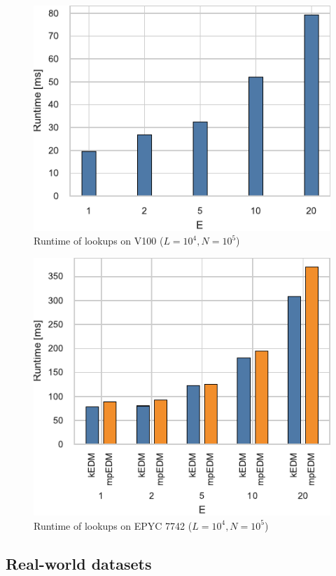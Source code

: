 \documentclass[sigconf]{acmart}
\begin{document}
\begin{figure}
    \centering
    \includegraphics[width=.9\linewidth]{figs/runtime_lookup_v100}
    \caption{Runtime of lookups on V100 ($L=10^4, N=10^5$)}%
    \label{fig:breakdown-lookup-v100}
\end{figure}

\begin{figure}
    \centering
    \includegraphics[width=.9\linewidth]{figs/runtime_lookup_epyc}
    \caption{Runtime of lookups on EPYC 7742 ($L=10^4, N=10^5$)}%
    \label{fig:breakdown-lookup-epyc}
\end{figure}

\subsection{Real-world datasets}
\end{document}
